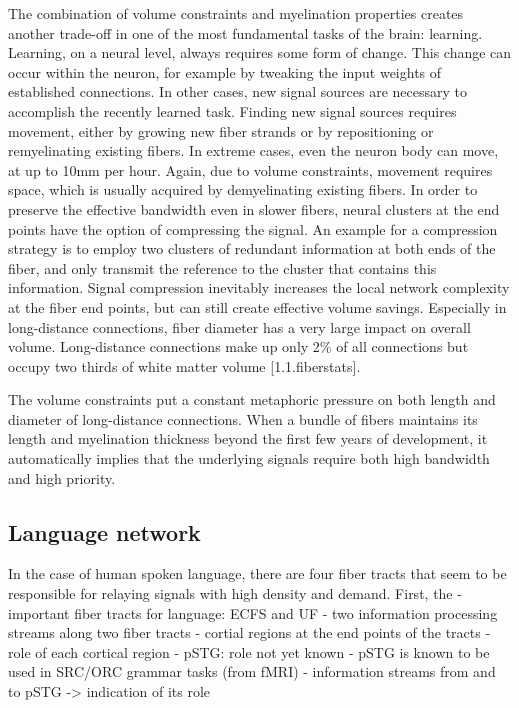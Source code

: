 The combination of volume constraints and myelination properties creates another trade-off in one of the most fundamental tasks of the brain: learning.
Learning, on a neural level, always requires some form of change.
This change can occur within the neuron, for example by tweaking the input weights of established connections.
In other cases, new signal sources are necessary to accomplish the recently learned task.
Finding new signal sources requires movement, either by growing new fiber strands or by repositioning or remyelinating existing fibers.
In extreme cases, even the neuron body can move, at up to 10mm per hour.
Again, due to volume constraints, movement requires space, which is usually acquired by demyelinating existing fibers.
In order to preserve the effective bandwidth even in slower fibers, neural clusters at the end points have the option of compressing the signal.
An example for a compression strategy is to employ two clusters of redundant information at both ends of the fiber, and only transmit the reference to the cluster that contains this information.
Signal compression inevitably increases the local network complexity at the fiber end points, but can still create effective volume savings.
Especially in long-distance connections, fiber diameter has a very large impact on overall volume.
Long-distance connections make up only 2\% of all connections but occupy two thirds of white matter volume [1.1.fiberstats].

The volume constraints put a constant metaphoric pressure on both length and diameter of long-distance connections.
When a bundle of fibers maintains its length and myelination thickness beyond the first few years of development, it automatically implies that the underlying signals require both high bandwidth and high priority.

\subsection{Language network}
In the case of human spoken language, there are four fiber tracts that seem to be responsible for relaying signals with high density and demand.
First, the 
- important fiber tracts for language: ECFS and UF
- two information processing streams along two fiber tracts
- cortial regions at the end points of the tracts
- role of each cortical region
- pSTG: role not yet known
- pSTG is known to be used in SRC/ORC grammar tasks (from fMRI)
- information streams from and to pSTG -> indication of its role

